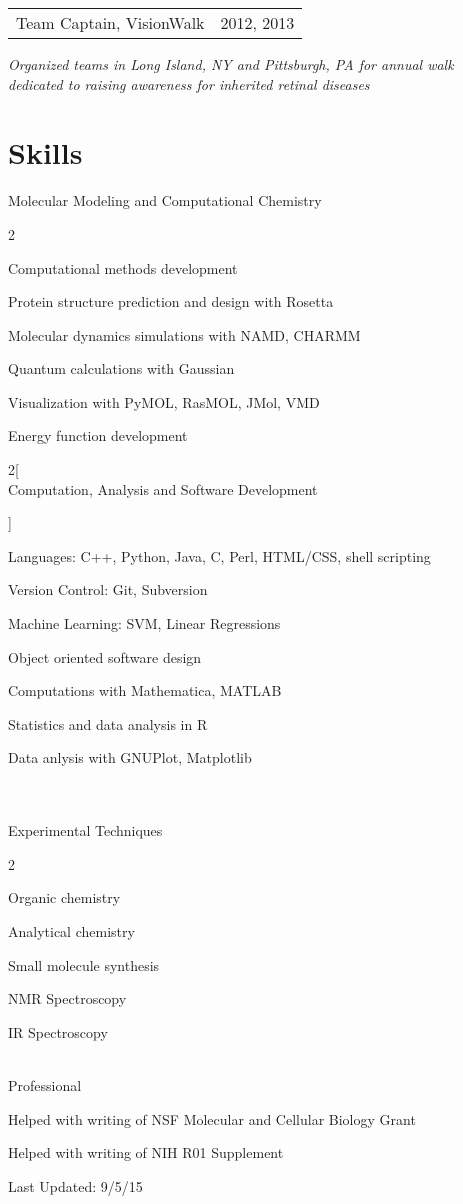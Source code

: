 \documentclass[12pt]{article}
\makeatletter
\newcommand{\allcapsspacing}[1]{{\addfontfeature{LetterSpace=7.5}#1}}
\newcommand{\leadershipitem}[3]{
\noindent
\begin{tabular*}{\textwidth}{@{\extracolsep{\fill}}lr}
		#1 & #2 \\
\end{tabular*}\newline\textit{#3}\vspace{0.75\baselineskip}\par}
\newcommand{\skillsitem}[1]{
\noindent 
#1\vspace{0.25\baselineskip}\par}
\makeatother
\begin{document}
\leadershipitem{Team Captain, VisionWalk}{2012, 2013}{Organized teams in Long Island, NY and Pittsburgh, PA for annual walk \\ dedicated to raising awareness for inherited retinal diseases}

\section*{\allcapsspacing{Skills}}

\skillsitem{Molecular Modeling and Computational Chemistry}
\begin{multicols}{2}
\begin{compactitem}
\item Computational methods development
\item Protein structure prediction and design with Rosetta
\item Molecular dynamics simulations with NAMD, CHARMM
\item Quantum calculations with Gaussian
\item Visualization with PyMOL, RasMOL, JMol, VMD
\item Energy function development
\end{compactitem}
\end{multicols}

\begin{multicols}{2}[\skillsitem{\\Computation, Analysis and Software Development}]
\begin{compactitem}
\item Languages: C++, Python, Java, C, Perl, HTML/CSS, shell scripting
\item Version Control: Git, Subversion 
\item Machine Learning: SVM, Linear Regressions
\item Object oriented software design
\item Computations with Mathematica, MATLAB
\item Statistics and data analysis in R
\item Data anlysis with GNUPlot, Matplotlib 
\end{compactitem} 
\end{multicols}

\skillsitem{\\\\Experimental Techniques} 
\begin{multicols}{2}
\begin{compactitem}
\item Organic chemistry
\item Analytical chemistry
\item Small molecule synthesis
\item NMR Spectroscopy
\item IR Spectroscopy
\end{compactitem}
\end{multicols}

\skillsitem{\\Professional}
\begin{compactitem}
\item Helped with writing of NSF Molecular and Cellular Biology Grant
\item Helped with writing of NIH R01 Supplement \\
\end{compactitem}

Last Updated: 9/5/15
\end{document}
